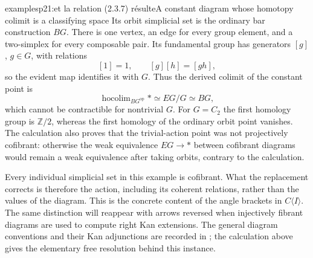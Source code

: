 \begin{dcomment}{examples}{p21:et la relation (2.3.7) résulte}{A constant diagram whose homotopy colimit is a classifying space}
Its orbit simplicial set is the ordinary bar construction $BG$. There is one vertex, an edge for every group element, and a two-simplex for every composable pair. Its fundamental group has generators $[g]$, $g\in G$, with relations
\[
 [1]=1,\qquad [g][h]=[gh],
\]
so the evident map identifies it with $G$. Thus the derived colimit of the constant point is
\[
 \operatorname{hocolim}_{BG^{\mathrm{op}}}*\simeq EG/G\simeq BG,
\]
which cannot be contractible for nontrivial $G$. For $G=C_2$ the first homology group is $\mathbb Z/2$, whereas the first homology of the ordinary orbit point vanishes. The calculation also proves that the trivial-action point was not projectively cofibrant: otherwise the weak equivalence $EG\to *$ between cofibrant diagrams would remain a weak equivalence after taking orbits, contrary to the calculation.

Every individual simplicial set in this example is cofibrant. What the replacement corrects is therefore the action, including its coherent relations, rather than the values of the diagram. This is the concrete content of the angle brackets in $C\langle I\rangle$. The same distinction will reappear with arrows reversed when injectively fibrant diagrams are used to compute right Kan extensions. The general diagram conventions and their Kan adjunctions are recorded in \citet[Definitions~A.2.8.1 and Proposition~A.2.8.7]{Lurie2009HTT}; the calculation above gives the elementary free resolution behind this instance.
\end{dcomment}

